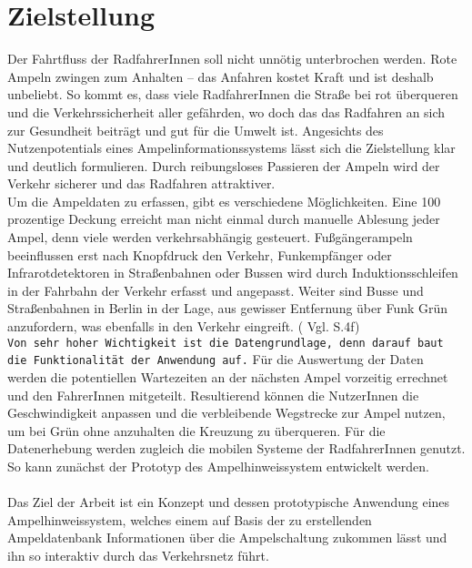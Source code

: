 \section{Zielstellung}
Der Fahrtfluss der RadfahrerInnen soll nicht unnötig unterbrochen werden. Rote Ampeln zwingen zum Anhalten -- das Anfahren kostet Kraft und ist deshalb unbeliebt. So kommt es, dass viele RadfahrerInnen die Straße bei rot überqueren und die Verkehrssicherheit aller gefährden, wo doch das das Radfahren an sich zur Gesundheit beiträgt und gut für die Umwelt ist. Angesichts des Nutzenpotentials eines Ampelinformationssystems lässt sich die Zielstellung klar und deutlich formulieren. Durch reibungsloses Passieren der Ampeln wird der Verkehr sicherer und das Radfahren attraktiver.\\
Um die Ampeldaten zu erfassen, gibt es verschiedene Möglichkeiten. Eine 100 prozentige Deckung erreicht man nicht einmal durch manuelle Ablesung jeder Ampel, denn viele  werden verkehrsabhängig gesteuert. Fußgängerampeln beeinflussen erst nach Knopfdruck den Verkehr, Funkempfänger oder Infrarotdetektoren in Straßenbahnen oder Bussen wird durch Induktionsschleifen in der Fahrbahn der Verkehr erfasst und angepasst. Weiter sind Busse und Straßenbahnen in Berlin in der Lage, aus gewisser Entfernung über Funk Grün anzufordern, was ebenfalls in den Verkehr eingreift. ( Vgl. \cite{lsa_bln} S.4f) \\
\texttt{Von sehr hoher Wichtigkeit ist die Datengrundlage, denn darauf baut die Funktionalität der Anwendung auf.}
Für die Auswertung der Daten werden die potentiellen Wartezeiten an der nächsten Ampel vorzeitig errechnet und den FahrerInnen mitgeteilt. Resultierend können die NutzerInnen die Geschwindigkeit anpassen und die verbleibende Wegstrecke zur Ampel nutzen, um bei Grün ohne anzuhalten die Kreuzung zu überqueren. Für die Datenerhebung werden zugleich die mobilen Systeme der RadfahrerInnen genutzt. So kann zunächst der Prototyp des Ampelhinweissystem entwickelt werden.\\\\
Das Ziel der Arbeit ist ein Konzept und dessen prototypische Anwendung eines Ampelhinweissystem, welches einem auf Basis der zu erstellenden  Ampeldatenbank Informationen über die Ampelschaltung zukommen lässt und ihn so interaktiv durch das Verkehrsnetz führt.
%
%
